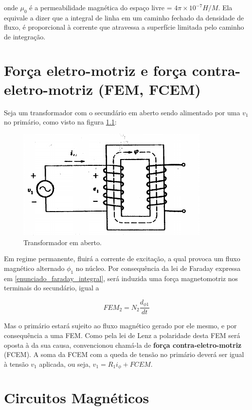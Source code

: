 \documentclass[]{report}
\begin{document}
onde $\mu_0$ é a permeabilidade magnética do espaço livre = $4 \pi \times 10^{-7} H/M$. Ela equivale a dizer que a integral de linha em um caminho fechado da densidade de fluxo, é proporcional à corrente que atravessa a superfície limitada pelo caminho de integração.

\chapter{Força eletro-motriz e força contra-eletro-motriz (FEM, FCEM)}

Seja um transformador com o secundário em aberto sendo alimentado por uma $v_1$ no primário, como visto na figura \ref{trafo_aberto}:
\begin{center}
\begin{figure}[htb]
\label{trafo_aberto}
\centering
\includegraphics[scale=0.5]{trafo_2_em_aberto}
\caption{Transformador em aberto. \cite{fitzgerald}}
\end{figure}
\end{center}

Em regime permanente, fluirá a corrente de excitação, a qual provoca um fluxo magnético alternado $\phi_1$ no núcleo. Por consequência da lei de Faraday expressa em \ref{enunciado_faraday_integral}, será induzida uma força magnetomotriz nos terminais do secundário, igual a

\begin{equation}
{FEM}_2 = N_2 \frac{d_{\phi 1}}{dt}
\end{equation}

Mas o primário estará sujeito ao fluxo magnético gerado por ele mesmo, e por consequência a uma FEM. Como pela lei de Lenz a polaridade desta FEM será oposta à da sua causa, convencionou chamá-la de \textbf{força contra-eletro-motriz} (FCEM). A soma da FCEM com a queda de tensão no primário deverá ser igual à tensão $v_1$ aplicada, ou seja, $v_1 = R_1 i_\phi + FCEM$.

\chapter{Circuitos Magnéticos}
\end{document}
